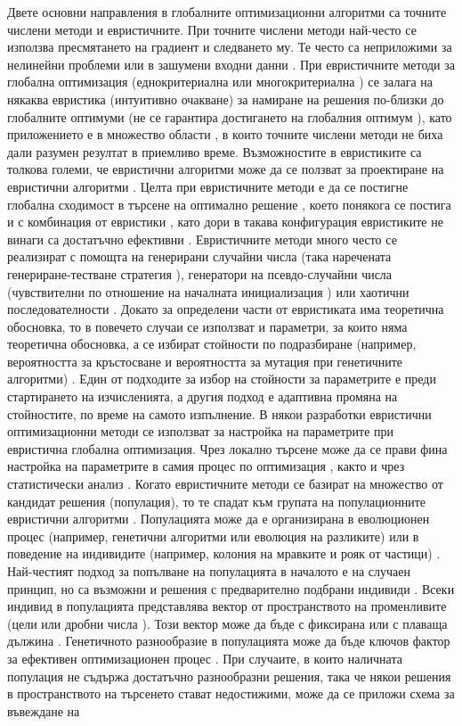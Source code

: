 Двете основни направления в глобалните оптимизационни алгоритми са точните числени методи и евристичните. При точните числени методи най-често се използва пресмятането на градиент и следването му. Те често са неприложими за нелинейни проблеми \cite{Koziel-01} или в зашумени входни данни \cite{Beyer-02}. При евристичните методи за глобална оптимизация (еднокритериална или многокритериална \cite{Cheng-01}) се залага на някаква евристика (интуитивно очакване) за намиране на решения по-близки до глобалните оптимуми (не се гарантира достигането на глобалния оптимум \cite{Coello-02}), като приложението е в множество области \cite{Slowik-02}, в които точните числени методи не биха дали разумен резултат в приемливо време. Възможностите в евристиките са толкова големи, че евристични алгоритми може да се ползват за проектиране на евристични алгоритми \cite{Diosan-01}. Целта при евристичните методи е да се постигне глобална сходимост \cite{He-02} в търсене на оптимално решение \cite{Beyer-01}, което понякога се постига и с комбинация от евристики \cite{Grosan-01}, като дори в такава конфигурация евристиките не винаги са достатъчно ефективни \cite{He-01}. Евристичните методи много често се реализират с помощта на генерирани случайни числа (така наречената генериране-тестване стратегия \cite{Yao-02}), генератори на псевдо-случайни числа \cite{Kazimipour-01} (чувствителни по отношение на началната инициализация \cite{Eiben-02}) или хаотични последователности \cite{Caponetto-01}. Докато за определени части от евристиката има теоретична обосновка, то в повечето случаи се използват и параметри, за които няма теоретична обосновка, а се избират стойности по подразбиране (например, вероятността за кръстосване и вероятността за мутация при генетичните алгоритми) \cite{Eiben-01}. Един от подходите за избор на стойности за параметрите е преди стартирането на изчисленията, а другия подход е адаптивна промяна на стойностите, по време на самото изпълнение. В някои разработки евристични оптимизационни методи се използват за настройка на параметрите при евристична глобална оптимизация. Чрез локално търсене може да се прави фина настройка на параметрите в самия процес по оптимизация \cite{Karafotias-01}, както и чрез статистически анализ \cite{Francois-01}. Когато евристичните методи се базират на множество от кандидат решения (популация), то те спадат към групата на популационните евристични алгоритми \cite{Whitley-01}. Популацията може да е организирана в еволюционен процес (например, генетични алгоритми или еволюция на разликите) или в поведение на индивидите (например, колония на мравките и рояк от частици) \cite{El-Abd-01}. Най-честият подход за попълване на популацията в началото е на случаен принцип, но са възможни и решения с предварително подбрани индивиди \cite{Coello-01}. Всеки индивид в популацията представлява вектор от пространството на променливите (цели или дробни числа \cite{Kachitvichyanukul-01}). Този вектор може да бъде с фиксирана или с плаваща дължина \cite{Ryerkerk-01}. Генетичното разнообразие в популацията може да бъде ключов фактор за ефективен оптимизационен процес \cite{Ursem-01}. При случаите, в които наличната популация не съдържа достатъчно разнообразни решения, така че някои решения в пространството на търсенето стават недостижими, може да се приложи схема за въвеждане на 